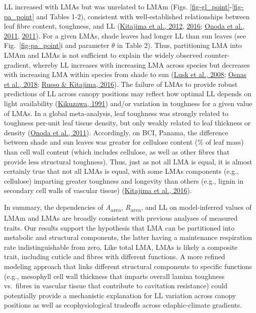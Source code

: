 \documentclass[
  12pt,
  letterpaper,
  DIV=11,
  numbers=noendperiod]{scrartcl}
\begin{document}
LL increased with LMAs but was unrelated to LMAm (Figs.
\ref{fig-gl_point}-\ref{fig-pa_point} and Tables 1-2), consistent with
well-established relationships between leaf fibre content, toughness,
and LL (\protect\hyperlink{ref-Kitajima2012}{Kitajima et al., 2012},
\protect\hyperlink{ref-Kitajima2016}{2016};
\protect\hyperlink{ref-Onoda2011}{Onoda et al., 2011},
\protect\hyperlink{ref-Onoda2011}{2011}). For a given LMAs, shade leaves
had longer LL than sun leaves (see Fig.~\ref{fig-pa_point}i and
parameter \(\theta\) in Table 2). Thus, partitioning LMA into LMAm and
LMAs is not sufficient to explain the widely observed counter-gradient,
whereby LL increases with increasing LMA across species but decreases
with increasing LMA within species from shade to sun
(\protect\hyperlink{ref-Lusk2008}{Lusk et al., 2008};
\protect\hyperlink{ref-Osnas2018}{Osnas et al., 2018};
\protect\hyperlink{ref-Russo2016}{Russo \& Kitajima, 2016}). The failure
of LMAs to provide robust predictions of LL across canopy positions may
reflect how optimal LL depends on light availability
(\protect\hyperlink{ref-Kikuzawa1991}{Kikuzawa, 1991}) and/or variation
in toughness for a given value of LMAs. In a global meta-analysis, leaf
toughness was strongly related to toughness per-unit leaf tissue
density, but only weakly related to leaf thickness or density
(\protect\hyperlink{ref-Onoda2011}{Onoda et al., 2011}). Accordingly, on
BCI, Panama, the difference between shade and sun leaves was greater for
cellulose content (\% of leaf mass) than cell wall content (which
includes cellulose, as well as other fibres that provide less structural
toughness). Thus, just as not all LMA is equal, it is almost certainly
true that not all LMAs is equal, with some LMAs components (e.g.,
cellulose) imparting greater toughness and longevity than others (e.g.,
lignin in secondary cell walls of vascular tissue)
(\protect\hyperlink{ref-Kitajima2016}{Kitajima et al., 2016}).

In summary, the dependencies of \emph{A}\textsubscript{area},
\emph{R}\textsubscript{area}, and LL on model-inferred values of LMAm
and LMAs are broadly consistent with previous analyses of measured
traits. Our results support the hypothesis that LMA can be partitioned
into metabolic and structural components, the latter having a
maintenance respiration rate indistinguishable from zero. Like total
LMA, LMAs is likely a composite trait, including cuticle and fibres with
different functions. A more refined modeling approach that links
different structural components to specific functions (e.g., mesophyll
cell wall thickness that imparts overall lamina toughness vs.~fibres in
vascular tissue that contribute to cavitation resistance) could
potentially provide a mechanistic explanation for LL variation across
canopy positions as well as ecophysiological tradeoffs across
edaphic-climate gradients.
\end{document}
